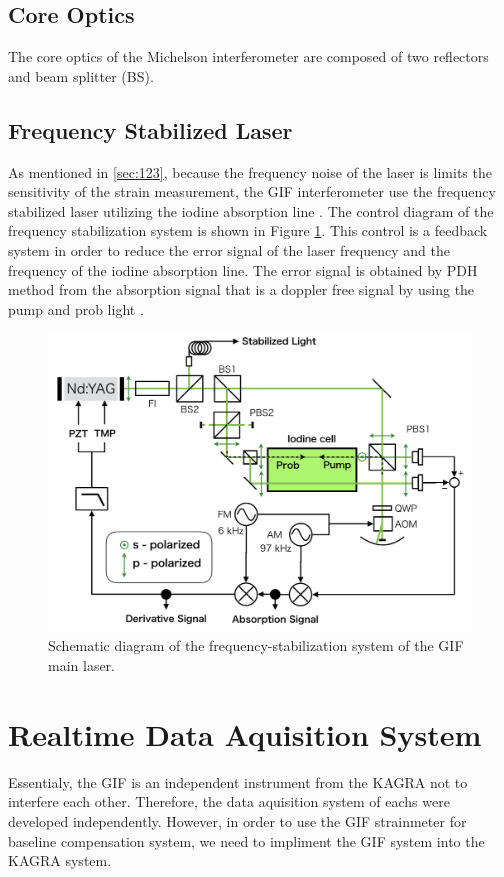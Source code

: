 \subsection{Core Optics}
The core optics of the Michelson interferometer are composed of two reflectors and beam splitter (BS). 


\subsection{Frequency Stabilized Laser} \label{sec:sec135}
As mentioned in \cref{sec:123}, because the frequency noise of the laser is limits the sensitivity of the strain measurement, the GIF interferometer use the frequency stabilized laser utilizing the iodine absorption line \cite{araya2002iodine}. The control diagram of the frequency stabilization system is shown in Figure \ref{img:img417}. This control is a feedback system in order to reduce the error signal of the laser frequency and the frequency of the iodine absorption line. The error signal is obtained by PDH method from the absorption signal that is a doppler free signal by using the pump and prob light \cite{snyder1980high}.
\begin{figure}[h]
  \begin{center}   
    \includegraphics[width=12cm]{./img_chap4/img417.png}
    \caption{Schematic diagram of the frequency-stabilization system of the GIF main laser.}\label{img:img417}
  \end{center}
\end{figure}




\section{Realtime Data Aquisition System} \label{sec:sec44}
Essentialy, the GIF is an independent instrument from the KAGRA not to interfere each other. Therefore, the data aquisition system of eachs were developed independently. However, in order to use the GIF strainmeter for baseline compensation system, we need to impliment the GIF system into the KAGRA system. 

